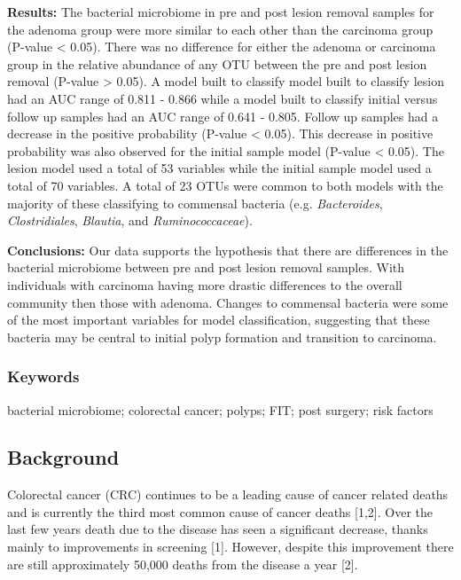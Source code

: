 \documentclass[12pt,]{article}
\begin{document}
\textbf{Results:} The bacterial microbiome in pre and post lesion
removal samples for the adenoma group were more similar to each other
than the carcinoma group (P-value \textless{} 0.05). There was no
difference for either the adenoma or carcinoma group in the relative
abundance of any OTU between the pre and post lesion removal (P-value
\textgreater{} 0.05). A model built to classify model built to classify
lesion had an AUC range of 0.811 - 0.866 while a model built to classify
initial versus follow up samples had an AUC range of 0.641 - 0.805.
Follow up samples had a decrease in the positive probability (P-value
\textless{} 0.05). This decrease in positive probability was also
observed for the initial sample model (P-value \textless{} 0.05). The
lesion model used a total of 53 variables while the initial sample model
used a total of 70 variables. A total of 23 OTUs were common to both
models with the majority of these classifying to commensal bacteria
(e.g. \emph{Bacteroides}, \emph{Clostridiales}, \emph{Blautia}, and
\emph{Ruminococcaceae}).

\textbf{Conclusions:} Our data supports the hypothesis that there are
differences in the bacterial microbiome between pre and post lesion
removal samples. With individuals with carcinoma having more drastic
differences to the overall community then those with adenoma. Changes to
commensal bacteria were some of the most important variables for model
classification, suggesting that these bacteria may be central to initial
polyp formation and transition to carcinoma.

\newpage

\subsubsection{Keywords}\label{keywords}

bacterial microbiome; colorectal cancer; polyps; FIT; post surgery; risk
factors

\newpage

\subsection{Background}\label{background}

Colorectal cancer (CRC) continues to be a leading cause of cancer
related deaths and is currently the third most common cause of cancer
deaths {[}1,2{]}. Over the last few years death due to the disease has
seen a significant decrease, thanks mainly to improvements in screening
{[}1{]}. However, despite this improvement there are still approximately
50,000 deaths from the disease a year {[}2{]}.
\end{document}
